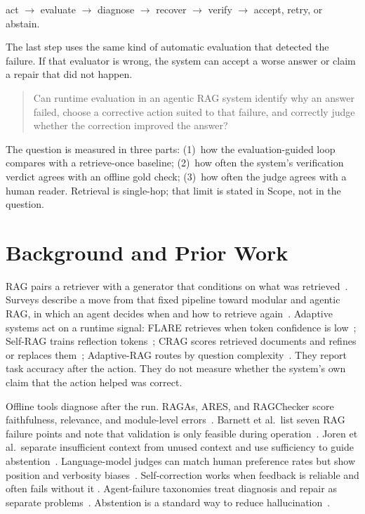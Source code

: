 \documentclass[12pt, a4paper, oneside]{report}
\begin{document}
\begin{center}
act $\rightarrow$ evaluate $\rightarrow$ diagnose $\rightarrow$ recover
$\rightarrow$ verify $\rightarrow$ accept, retry, or abstain.
\end{center}

The last step uses the same kind of automatic evaluation that detected the
failure. If that evaluator is wrong, the system can accept a worse answer
or claim a repair that did not happen.

\begin{quote}
Can runtime evaluation in an agentic RAG system identify why an answer
failed, choose a corrective action suited to that failure, and correctly
judge whether the correction improved the answer?
\end{quote}

The question is measured in three parts: (1)~how the evaluation-guided
loop compares with a retrieve-once baseline; (2)~how often the system's
verification verdict agrees with an offline gold check; (3)~how often the
judge agrees with a human reader. Retrieval is single-hop; that limit is
stated in Scope, not in the question.

\section{Background and Prior Work}

RAG pairs a retriever with a generator that conditions on what was
retrieved~\cite{lewis2020rag}. Surveys describe a move from that fixed
pipeline toward modular and agentic RAG, in which an agent decides when
and how to retrieve again~\cite{gao2023ragsurvey,singh2025agenticrag}.
Adaptive systems act on a runtime signal: FLARE retrieves when token
confidence is low~\cite{jiang2023flare}; Self-RAG trains reflection
tokens~\cite{asai2024selfrag}; CRAG scores retrieved documents and
refines or replaces them~\cite{yan2024crag}; Adaptive-RAG routes by
question complexity~\cite{jeong2024adaptiverag}. They report task
accuracy after the action. They do not measure whether the system's own
claim that the action helped was correct.

Offline tools diagnose after the run. RAGAs, ARES, and RAGChecker score
faithfulness, relevance, and module-level
errors~\cite{es2024ragas,saadfalcon2024ares,ru2024ragchecker}. Barnett
et al.\ list seven RAG failure points and note that validation is only
feasible during operation~\cite{barnett2024sevenfailure}. Joren et al.\
separate insufficient context from unused context and use sufficiency to
guide abstention~\cite{joren2025sufficient}. Language-model judges can
match human preference rates but show position and verbosity
biases~\cite{zheng2023judging,wang2024fair}. Self-correction works when
feedback is reliable and often fails without it
\cite{huang2024cannot,kamoi2024selfcorrection,shinn2023reflexion}.
Agent-failure taxonomies treat diagnosis and repair as separate
problems~\cite{cemri2025mast,zhu2025agentdebug}. Abstention is a standard
way to reduce hallucination~\cite{wen2025abstention}.
\end{document}
